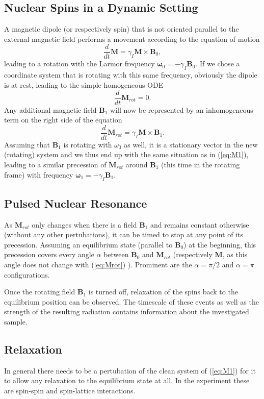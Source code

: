 \documentclass[a4paper]{scrartcl}
\numberwithin{equation}{section}
\numberwithin{figure}{section}
\numberwithin{table}{section}
\newcommand{\eq}[2]{\begin{equation}#1\label{#2}\end{equation}}
\newcommand{\ve}[1]{\mathbf{ #1} }
\begin{document}
\subsection{Nuclear Spins in a Dynamic Setting}
A magnetic dipole (or respectively spin) that is not oriented parallel to the external magnetic field performs a movement according to the equation of motion
\eq{\frac{d}{dt}\ve M = \gamma_I \ve M \times \ve B_0 ,}{eq:M1}
leading to a rotation with the Larmor frequency $\ve \omega_0 = -\gamma_I \ve B_0$. If we chose a coordinate system that is rotating with this same frequency, obviously the dipole is at rest, leading to the simple homogeneous ODE
\eq{\frac{d}{dt}\ve M_{rot} = 0.}{eq:Mrot}
Any additional magnetic field $\ve B_1$ will now be represented by an inhomogeneous term on the right side of the equation
\eq{\frac{d}{dt}\ve M_{rot} = \gamma_I \ve M \times \ve B_1.}{}
Assuming that $\ve B_1$ is rotating with $\omega_0$ as well, it is a stationary vector in the new (rotating) system and we thus end up with the same situation as in (\ref{eq:M1}), leading to a similar precession of $\ve M_{rot}$ around $\ve B_1$ (this time in the rotating frame) with frequency $\ve \omega_1 = -\gamma_I \ve B_1$.


\subsection{Pulsed Nuclear Resonance}
As $\ve M_{rot}$ only changes when there is a field $\ve B_1$ and remains constant otherwise (without any other pertubations), it can be timed to stop at any point of its precession. Assuming an equilibrium state (parallel to $\ve B_0$) at the beginning, this precession covers every angle $\alpha$ between $\ve B_0$ and $\ve M_{rot}$ (respectively $\ve M$, as this angle does not change with (\ref{eq:Mrot}) ). Prominent are the $\alpha = \pi/2$ and $\alpha = \pi$ configurations.

Once the rotating field $\ve B_1$ is turned off, relaxation of the spins back to the equilibrium position can be observed. The timescale of these events as well as the strength of the resulting radiation contains information about the investigated sample.


\subsection{Relaxation}
In general there needs to be a pertubation of the clean system of (\ref{eq:M1}) for it to allow any relaxation to the equilibrium state at all. In the experiment these are spin-spin and spin-lattice interactions.
\end{document}
